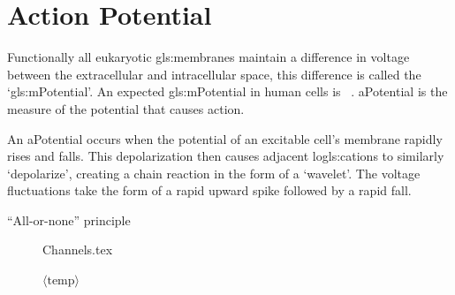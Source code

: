 \documentclass[../../Orator]{subfiles}
\begin{document}
\section{Action Potential}

Functionally all eukaryotic \glspl{gls:membrane} maintain a difference in voltage between the extracellular and intracellular space, this difference is called the `\gls{gls:mPotential}'. An expected \gls{gls:mPotential} in human cells is ~\cite{}.
\gls{aPotential} is the measure of the potential that causes action.

An \gls{aPotential} occurs when the potential of an excitable cell's membrane rapidly rises and falls. This depolarization then causes adjacent lo\glspl{gls:cation} to similarly `depolarize', creating a chain reaction in the form of a `wavelet'.
The voltage fluctuations take the form of a rapid upward spike followed by a rapid fall.

``All-or-none'' principle

\begin{figure}[H]
    \centering
    {Channels.tex}
    \caption{ $\langle \text{temp} \rangle$ }\label{fig:Channels}
\end{figure}
\end{document}

